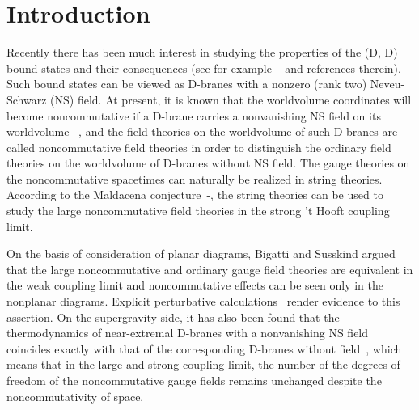 \documentclass[a4paper,12pt]{article}
\providecommand{\sect}[1]{\setcounter{equation}{0}\section{#1}}
\begin{document}
\newpage
\renewcommand{\thefootnote}{\arabic{footnote}}
\setcounter{footnote}{0}
\setcounter{page}{2}


\sect{Introduction}

Recently there has been much interest in studying the properties of
the (D\coordHE{}, D\coordHE{}) bound states and their consequences (see for
example~\cite{Hashimoto1}-\cite{Lu} and references therein).
Such bound states can be viewed as D\coordHE{}-branes with a nonzero (rank two)
Neveu-Schwarz (NS) \coordHE{} field. At present, it is known that the worldvolume
coordinates will become noncommutative if a D\coordHE{}-brane carries a
nonvanishing NS \coordHE{} field on its worldvolume~\cite{Li}-\cite{Seiberg},
and the field theories on the worldvolume of such D-branes are called
noncommutative field theories in order to distinguish the ordinary field
theories on the worldvolume of D-branes without NS \coordHE{} field. The gauge
theories on the noncommutative spacetimes can naturally be realized in
string theories. According to the Maldacena
conjecture~\cite{Mald2}-\cite{Itzhaki}, the string theories can be used to
study the large \coordHE{} noncommutative field theories in the strong 't Hooft
coupling limit.

On the basis of consideration of planar diagrams, Bigatti and Susskind
\cite{BS} argued that the large \coordHE{} noncommutative and ordinary gauge field
theories are equivalent in the weak coupling limit and noncommutative
effects can be seen only in the nonplanar diagrams. Explicit perturbative
calculations~\cite{Arcioni} render evidence to this assertion. On the
supergravity side, it has also been found that the thermodynamics of
near-extremal D\coordHE{}-branes with a nonvanishing NS \coordHE{} field coincides exactly
with that of the corresponding D\coordHE{}-branes without \coordHE{}
field~\cite{Mald1,Ali,Bar,CO,Harmark}, which means that in the large \coordHE{}
and strong coupling limit, the number of the degrees of freedom of
the noncommutative gauge fields remains unchanged despite the
noncommutativity of space.
\end{document}

